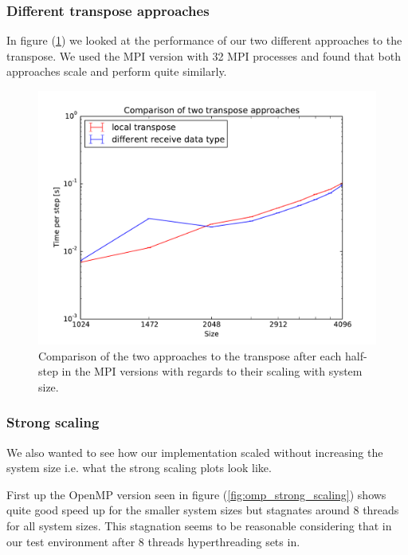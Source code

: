 \documentclass[11pt,a4paper]{article} %
\begin{document}
\subsubsection{Different transpose approaches}

In figure (\ref{fig:transpose_system_size_scaling}) we looked at the performance of our two different approaches to the transpose.
We used the MPI version with 32 MPI processes and found that both approaches scale and perform quite similarly.


\begin{figure}
\includegraphics[width=\textwidth]{mpi_transpose_32.pdf}
\caption{Comparison of the two approaches to the transpose after each half-step in the MPI versions with regards to their scaling with system size.}
\label{fig:transpose_system_size_scaling}
\end{figure}

\subsubsection{Strong scaling}

We also wanted to see how our implementation scaled without increasing the system size i.e. what the strong scaling plots look like.

First up the OpenMP version seen in figure (\ref{fig:omp_strong_scaling}) shows quite good speed up for the smaller system sizes but stagnates around 8 threads for all system sizes.
This stagnation seems to be reasonable considering that in our test environment after 8 threads hyperthreading sets in.
\end{document}
